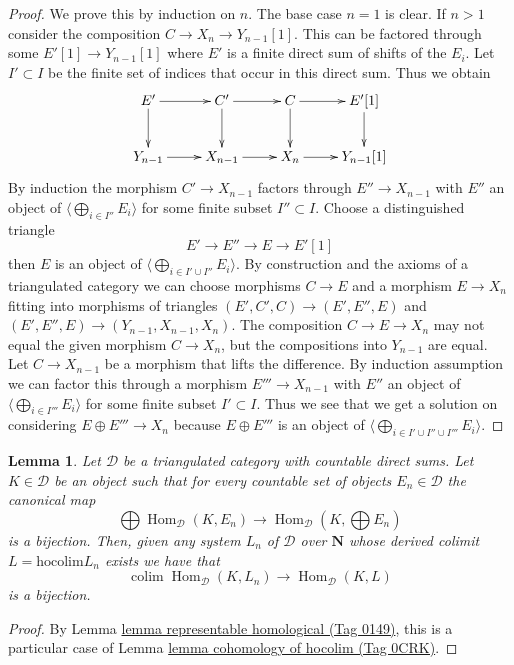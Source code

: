 \documentclass{amsart}
\theoremstyle{plain}
\newtheorem{lemma}[subsection]{Lemma}
\theoremstyle{definition}
\theoremstyle{remark}
\numberwithin{equation}{subsection}
\def\colim{\mathop{\mathrm{colim}}\nolimits}
\def\Hom{\mathop{\mathrm{Hom}}\nolimits}
\begin{document}
\begin{proof}
We prove this by induction on $n$. The base case $n = 1$ is clear.
If $n > 1$ consider the composition $C \to X_n \to Y_{n - 1}[1]$.
This can be factored through some $E'[1] \to Y_{n - 1}[1]$ where
$E'$ is a finite direct sum of shifts of the $E_i$. Let $I' \subset I$
be the finite set of indices that occur in this direct sum. Thus we obtain
$$
\xymatrix{
E' \ar[r] \ar[d] &
C' \ar[r] \ar[d] &
C \ar[r] \ar[d] &
E'[1] \ar[d] \\
Y_{n - 1} \ar[r] &
X_{n - 1} \ar[r] &
X_n \ar[r] &
Y_{n - 1}[1]
}
$$
By induction the morphism $C' \to X_{n - 1}$ factors through
$E'' \to X_{n - 1}$ with $E''$ an object of
$\langle \bigoplus_{i \in I''} E_i \rangle$
for some finite subset $I'' \subset I$. Choose a distinguished
triangle
$$
E' \to E'' \to E \to E'[1]
$$
then $E$ is an object of $\langle \bigoplus_{i \in I' \cup I''} E_i \rangle$.
By construction and the axioms of a triangulated category we can choose
morphisms $C \to E$ and a morphism $E \to X_n$ fitting into morphisms
of triangles $(E', C', C) \to (E', E'', E)$ and
$(E', E'', E) \to (Y_{n - 1}, X_{n - 1}, X_n)$. The composition
$C \to E \to X_n$ may not equal the given morphism $C \to X_n$, but
the compositions into $Y_{n - 1}$ are equal. Let $C \to X_{n - 1}$
be a morphism that lifts the difference. By induction assumption we
can factor this through a morphism $E''' \to X_{n - 1}$ with
$E''$ an object of $\langle \bigoplus_{i \in I'''} E_i \rangle$
for some finite subset $I' \subset I$. Thus we see that we get
a solution on considering $E \oplus E''' \to X_n$ because
$E \oplus E'''$ is an object of
$\langle \bigoplus_{i \in I' \cup I'' \cup I'''} E_i \rangle$.
\end{proof}


\begin{lemma}
\label{derived-lemma-commutes-with-countable-sums}
Let $\mathcal{D}$ be a triangulated category with countable direct sums.
Let $K \in \mathcal{D}$ be an object such that for every
countable set of objects $E_n \in \mathcal{D}$ the canonical map
$$
\bigoplus \Hom_\mathcal{D}(K, E_n)
\longrightarrow
\Hom_\mathcal{D}(K, \bigoplus E_n)
$$
is a bijection. Then, given any system $L_n$ of $\mathcal{D}$ over
$\mathbf{N}$ whose derived colimit $L = \text{hocolim} L_n$
exists we have that
$$
\colim \Hom_\mathcal{D}(K, L_n) \longrightarrow \Hom_\mathcal{D}(K, L)
$$
is a bijection.
\end{lemma}

\begin{proof}
By Lemma \href{https://stacks.math.columbia.edu/tag/0149}{lemma representable homological (Tag 0149)}, this is a particular case
of Lemma \href{https://stacks.math.columbia.edu/tag/0CRK}{lemma cohomology of hocolim (Tag 0CRK)}.
\end{proof}
\end{document}
